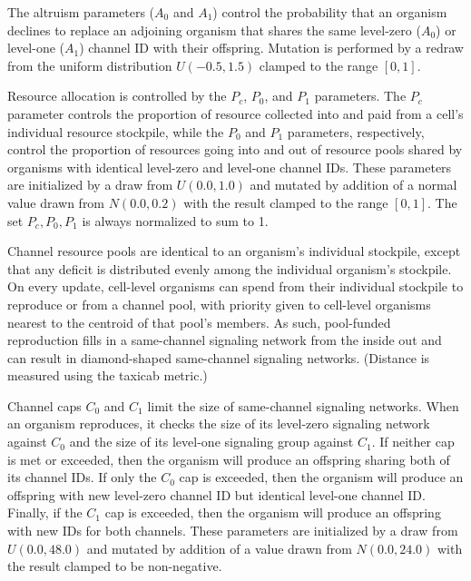 The altruism parameters ($A_0$ and $A_1$) control the probability that an organism declines to replace an adjoining organism that shares the same level-zero ($A_0$) or level-one ($A_1$) channel ID with their offspring.
Mutation is performed by a redraw from the uniform distribution $U(-0.5,1.5)$ clamped to the range $[0,1]$.

Resource allocation is controlled by the $P_{c}$, $P_0$, and $P_1$ parameters.
The $P_{c}$ parameter controls the proportion of resource collected into and paid from a cell's individual resource stockpile, while the $P_0$ and $P_1$ parameters, respectively, control the proportion of resources going into and out of resource pools shared by organisms with identical level-zero and level-one channel IDs.
These parameters are initialized by a draw from $U(0.0, 1.0)$ and mutated by addition of a normal value drawn from $N(0.0,0.2)$ with the result clamped to the range $[0,1]$.
The set $P_{c}, P_0, P_1$ is always normalized to sum to 1.

Channel resource pools are identical to an organism's individual stockpile, except that any deficit is distributed evenly among the individual organism's stockpile.
On every update, cell-level organisms can spend from their individual stockpile to reproduce or from a channel pool, with priority given to cell-level organisms nearest to the centroid of that pool's members.
As such, pool-funded reproduction fills in a same-channel signaling network from the inside out and can result in diamond-shaped same-channel signaling networks.
(Distance is measured using the taxicab metric.)

Channel caps $C_0$ and $C_1$ limit the size of same-channel signaling networks.
When an organism reproduces, it checks the size of its level-zero signaling network against $C_0$ and the size of its level-one signaling group against $C_1$.
If neither cap is met or exceeded, then the organism will produce an offspring sharing both of its channel IDs.
If only the $C_0$ cap is exceeded, then the organism will produce an offspring with new level-zero channel ID but identical level-one channel ID.
Finally, if the $C_1$ cap is exceeded, then the organism will produce an offspring with new IDs for both channels.
These parameters are initialized by a draw from $U(0.0, 48.0)$ and mutated by addition of a value drawn from $N(0.0,24.0)$ with the result clamped to be non-negative.

